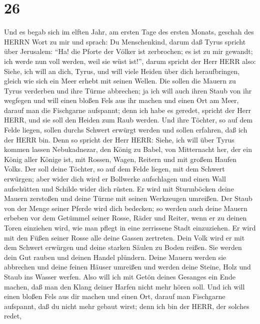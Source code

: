 \hypertarget{section-25}{%
\section{26}\label{section-25}}

 Und es begab sich im elften Jahr, am ersten Tage des ersten
Monats, geschah des HERRN Wort zu mir und sprach:  Du
Menschenkind, darum daß Tyrus spricht über Jerusalem: ``Ha! die Pforte
der Völker ist zerbrochen; es ist zu mir gewandt; ich werde nun voll
werden, weil sie wüst ist!'',  darum spricht der Herr HERR
also: Siehe, ich will an dich, Tyrus, und will viele Heiden über dich
heraufbringen, gleich wie sich ein Meer erhebt mit seinen Wellen.
 Die sollen die Mauern zu Tyrus verderben und ihre Türme
abbrechen; ja ich will auch ihren Staub von ihr wegfegen und will einen
bloßen Fels aus ihr machen  und einen Ort am Meer, darauf
man die Fischgarne aufspannt; denn ich habe es geredet, spricht der Herr
HERR, und sie soll den Heiden zum Raub werden.  Und ihre
Töchter, so auf dem Felde liegen, sollen durchs Schwert erwürgt werden
und sollen erfahren, daß ich der HERR bin.  Denn so spricht
der Herr HERR: Siehe, ich will über Tyrus kommen lassen Nebukadnezar,
den König zu Babel, von Mitternacht her, der ein König aller Könige ist,
mit Rossen, Wagen, Reitern und mit großem Haufen Volks.  Der
soll deine Töchter, so auf dem Felde liegen, mit dem Schwert erwürgen;
aber wider dich wird er Bollwerke aufschlagen und einen Wall aufschütten
und Schilde wider dich rüsten.  Er wird mit Sturmböcken
deine Mauern zerstoßen und deine Türme mit seinen Werkzeugen umreißen.
 Der Staub von der Menge seiner Pferde wird dich bedecken;
so werden auch deine Mauern erbeben vor dem Getümmel seiner Rosse, Räder
und Reiter, wenn er zu deinen Toren einziehen wird, wie man pflegt in
eine zerrissene Stadt einzuziehen.  Er wird mit den Füßen
seiner Rosse alle deine Gassen zertreten. Dein Volk wird er mit dem
Schwert erwürgen und deine starken Säulen zu Boden reißen. 
Sie werden dein Gut rauben und deinen Handel plündern. Deine Mauern
werden sie abbrechen und deine feinen Häuser umreißen und werden deine
Steine, Holz und Staub ins Wasser werfen.  Also will ich
mit Getön deines Gesanges ein Ende machen, daß man den Klang deiner
Harfen nicht mehr hören soll.  Und ich will einen bloßen
Fels aus dir machen und einen Ort, darauf man Fischgarne aufspannt, daß
du nicht mehr gebaut wirst; denn ich bin der HERR, der solches redet,
